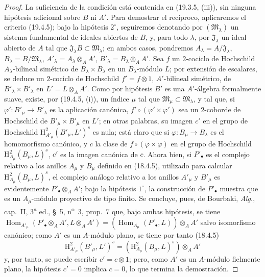 \begin{proof}
La suficiencia de la condición está contenida en (19.3.5, (iii)), sin ninguna
hipótesis adicional sobre $B$ ni $A'$. Para demostrar el recíproco,
aplicaremos el criterio (19.4.5); bajo la hipótesis $2^\circ$,
seguiremos denotando por $(\mathfrak M_\lambda)$ un sistema fundamental
de ideales abiertos de $B$, y, para todo $\lambda$, por
$\mathfrak J_\lambda$ un ideal abierto de $A$ tal que
$\mathfrak J_\lambda B\subset\mathfrak M_\lambda$; en ambos
casos, pondremos
$A_\lambda=A/\mathfrak J_\lambda$,
$B_\lambda=B/\mathfrak M_\lambda$,
$A'_\lambda=A_\lambda\otimes_A A'$,
$B'_\lambda=B_\lambda\otimes_A A'$. Sea $f$ un $2$-cociclo de
Hochschild $A_\lambda$-bilineal simétrico de
$B_\lambda\times B_\lambda$ en un $B_\lambda$-módulo $L$; por
extensión de escalares, se deduce un $2$-cociclo de Hochschild
$f'=f\otimes1$, $A'$-bilineal simétrico, de
$B'_\lambda\times B'_\lambda$ en $L'=L\otimes_A A'$. Como por
hipótesis $B'$ es una $A'$-álgebra formalmente suave, existe, por (19.4.5,
(i)), un índice $\mu$ tal que
$\mathfrak M_\mu\subset\mathfrak M_\lambda$, y tal que, si
$\varphi':B'_\mu\to B'_\lambda$ es la aplicación canónica,
$f'\circ(\varphi'\times\varphi')$ sea un $2$-coborde de Hochschild de
$B'_\mu\times B'_\mu$ en $L'$; en otras palabras, su imagen $c'$ en el
grupo de Hochschild
$\mathrm H^2_{A'_\mu}(B'_\mu,L')^s$ es nula; está claro que si
$\varphi:B_\mu\to B_\lambda$ es el homomorfismo canónico, y $c$ la
clase de $f\circ(\varphi\times\varphi)$ en el grupo de Hochschild
$\mathrm H^2_{A_\mu}(B_\mu,L)^s$, $c'$ es la imagen canónica de $c$.
Ahora bien, si $P'_\bullet$ es el complejo relativo a los anillos $A_\mu$ y
$B_\mu$ definido en (18.4.5), utilizado para calcular
$\mathrm H^2_{A_\mu}(B_\mu,L)^s$, el complejo análogo relativo a los
anillos $A'_\mu$ y $B'_\mu$ es evidentemente
$P'_\bullet\otimes_A A'$; bajo la hipótesis $1^\circ$, la construcción de
$P'_\bullet$ muestra que es un $A_\mu$-módulo proyectivo de tipo finito.
Se concluye, pues, de Bourbaki, \emph{Alg.}, cap.~II, 3\textsuperscript{a} ed., §~5,
n\textsuperscript{o}~3, prop.~7 que, bajo ambas hipótesis, se tiene
$\operatorname{Hom}_{A'_\mu}(P'_\bullet\otimes_A A',L\otimes_A A')
=(\operatorname{Hom}_{A_\mu}(P'_\bullet,L))\otimes_A A'$
salvo isomorfismo canónico; como $A'$ es un $A$-módulo plano, se tiene por
tanto (18.4.5)
\[
  \mathrm H^2_{A'_\mu}(B'_\mu,L')^s
  =(\mathrm H^2_{A_\mu}(B_\mu,L)^s)\otimes_A A'
\]
y, por tanto, se puede escribir $c'=c\otimes1$; pero, como $A'$ es un $A$-módulo
fielmente plano, la hipótesis $c'=0$ implica $c=0$, lo que termina la
demostración.
\end{proof}


